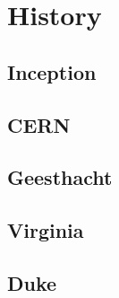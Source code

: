 \chapter{History} 
\label{history} %
\section{Inception}  
 
\section{CERN} 
 
\section{Geesthacht} 

\section{Virginia}

\section{Duke}